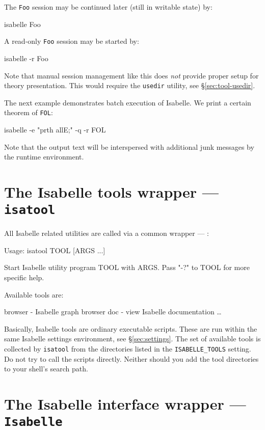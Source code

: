 The \texttt{Foo} session may be continued later (still in writable
state) by:
\begin{ttbox}
isabelle Foo
\end{ttbox}
A read-only \texttt{Foo} session may be started by:
\begin{ttbox}
isabelle -r Foo
\end{ttbox}

\medskip Note that manual session management like this does \emph{not} provide
proper setup for theory presentation.  This would require the \texttt{usedir}
utility, see \S\ref{sec:tool-usedir}.

\bigskip The next example demonstrates batch execution of Isabelle. We print a
certain theorem of \texttt{FOL}:
\begin{ttbox}
isabelle -e "prth allE;" -q -r FOL
\end{ttbox}
Note that the output text will be interspersed with additional junk messages
by the {\ML} runtime environment.


\section{The Isabelle tools wrapper --- \texttt{isatool}} \label{sec:isatool}

All Isabelle related utilities are called via a common wrapper ---
:
\begin{ttbox}
Usage: isatool TOOL [ARGS ...]

  Start Isabelle utility program TOOL with ARGS. Pass "-?" to TOOL
  for more specific help.

  Available tools are:

    browser - Isabelle graph browser
    doc - view Isabelle documentation
    \dots
\end{ttbox}
Basically, Isabelle tools are ordinary executable scripts.  These are run
within the same Isabelle settings environment, see \S\ref{sec:settings}.  The
set of available tools is collected by \texttt{isatool} from the directories
listed in the \texttt{ISABELLE_TOOLS} setting.  Do not try to call the scripts
directly.  Neither should you add the tool directories to your shell's search
path.


\section{The Isabelle interface wrapper --- \texttt{Isabelle}} \label{sec:interface}

